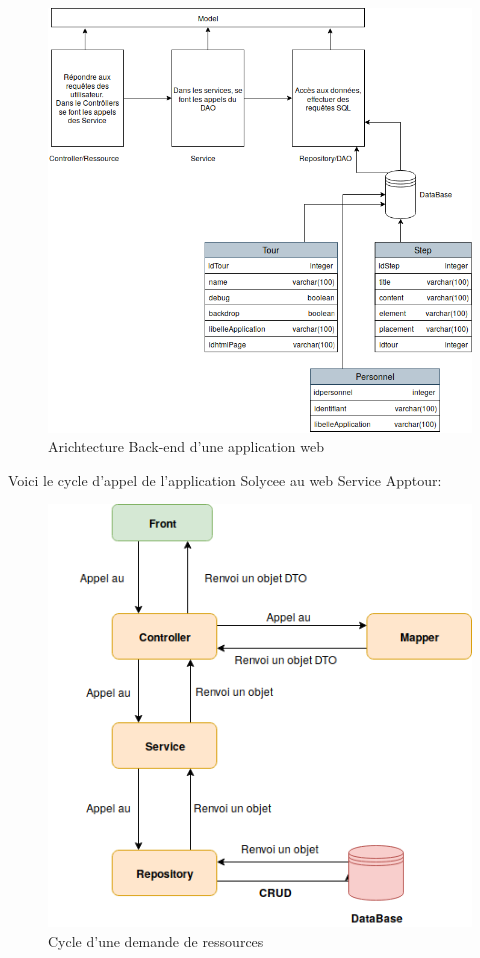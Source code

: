\documentclass[12pt]{article}
\begin{document}
\begin{figure}[H]
	\centering
 		\includegraphics[width=1\textwidth]{diagrammes/Architecture_Apptour.png}
  		\caption{Arichtecture Back-end d'une application web}
	\end{figure}
	

Voici le cycle  d'appel de l'application Solycee au web Service Apptour:  

\begin{figure}[H]
	\centering
 		\includegraphics[width=1\textwidth]{diagrammes/schema_apptour.png}
  		\caption{Cycle d'une demande de ressources}
	\end{figure}
\end{document}
